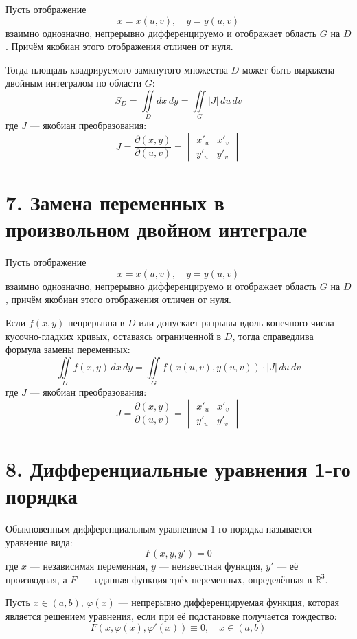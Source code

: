 \documentclass[17pt,a4paper]{extreport}
\begin{document}
Пусть отображение
\[
x = x(u,v), \quad y = y(u,v)
\]
взаимно однозначно, непрерывно дифференцируемо и отображает область $G$ на $D$. Причём якобиан этого отображения отличен от нуля.

Тогда площадь квадрируемого замкнутого множества $D$ может быть выражена двойным интегралом по области $G$:
\[
S_D = \iint\limits_D dx\,dy = \iint\limits_G |J|\,du\,dv
\]
где $J$ --- якобиан преобразования:
\[
J = \frac{\partial(x,y)}{\partial(u,v)} = 
\begin{vmatrix}
x'_u & x'_v \\
y'_u & y'_v
\end{vmatrix}
\]

\newpage

\section{7. Замена переменных в произвольном двойном интеграле}

Пусть отображение
\[
x = x(u,v), \quad y = y(u,v)
\]
взаимно однозначно, непрерывно дифференцируемо и отображает область $G$ на $D$, причём якобиан этого отображения отличен от нуля.

Если $f(x,y)$ непрерывна в $D$ или допускает разрывы вдоль конечного числа кусочно-гладких кривых, оставаясь ограниченной в $D$, тогда справедлива формула замены переменных:
\[
\iint\limits_D f(x,y)\,dx\,dy = \iint\limits_G f(x(u,v), y(u,v)) \cdot |J|\,du\,dv
\]
где $J$ --- якобиан преобразования:
\[
J = \frac{\partial(x,y)}{\partial(u,v)} = 
\begin{vmatrix}
x'_u & x'_v \\
y'_u & y'_v
\end{vmatrix}
\]

\newpage

\section{8. Дифференциальные уравнения 1-го порядка}

Обыкновенным дифференциальным уравнением 1-го порядка называется уравнение вида:
\[
F(x, y, y') = 0
\]
где $x$ --- независимая переменная, $y$ --- неизвестная функция, $y'$ --- её производная, а $F$ --- заданная функция трёх переменных, определённая в $\mathbb{R}^3$.

Пусть $x \in (a, b)$, $\varphi(x)$ --- непрерывно дифференцируемая функция, которая является решением уравнения, если при её подстановке получается тождество:
\[
F(x, \varphi(x), \varphi'(x)) \equiv 0, \quad x \in (a, b)
\]
\end{document}
